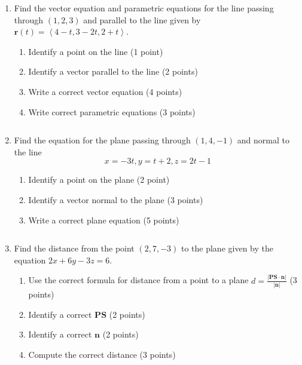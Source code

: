 \documentclass[12pt]{article}
\newcommand{\up}{$~$\vspace*{-0.7in}}
\newcommand{\liner}{\noindent\underline{\hspace*{7in}}}
\renewcommand{\vec}{\mathbf}
\newcommand{\<}{\left<}
\renewcommand{\>}{\right>}
\begin{document}
\begin{enumerate}
\item Find the vector equation and parametric equations for the line passing through $(1,2,3)$ and parallel to the line given by $\vec{r}(t)=\<4-t,3-2t,2+t\>$.

\begin{enumerate}
\item Identify a point on the line (1 point) 
\item Identify a vector parallel to the line (2 points)
\item Write a correct vector equation (4 points) 
\item Write correct parametric equations (3 points)
\end{enumerate}

\vspace*{7in}

\liner
\newpage\up

\item Find the equation for the plane passing through $(1,4,-1)$ and normal to the line $$x=-3t, y=t+2, z=2t-1$$

\begin{enumerate}
\item Identify a point on the plane (2 point) 
\item Identify a vector normal to the plane (3 points) 
\item Write a correct plane equation (5 points)
\end{enumerate}

\vspace*{7in}

\liner
\newpage\up

\item Find the distance from the point $(2,7,-3)$ to the plane given by the equation $2x+6y-3z=6$.

\begin{enumerate}
\item Use the correct formula for distance from a point to a plane $d = \frac{|\vec{PS}\cdot\vec{n}|}{|\vec{n}|}$ (3 points)
\item Identify a correct $\vec{PS}$ (2 points) 
\item Identify a correct $\vec{n}$ (2 points) 
\item Compute the correct distance (3 points)
\end{enumerate}


\end{enumerate}
\end{document}
